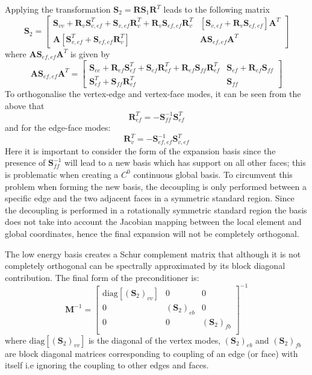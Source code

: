 %
Applying the transformation
$\mathbf{S}_{2}=\mathbf{R} \mathbf{S}_{1} \mathbf{R}^{T}$ leads to the following
matrix
%
\[
\mathbf{S}_{2}=\left[ \begin{array}{cc}
\mathbf{S}_{vv}+\mathbf{R}_{v}\mathbf{S}^{T}_{v,ef}+\mathbf{S}_{v,ef}\mathbf{R}^{T}_{v}+\mathbf{R}_{v}\mathbf{S}_{ef,ef}\mathbf{R}^{T}_{v} & [\mathbf{S}_{v,ef}+\mathbf{R}_{v}\mathbf{S}_{ef,ef}]\mathbf{A}^{T} \\
\mathbf{A}[\mathbf{S}^{T}_{v,ef}+\mathbf{S}_{ef,ef}\mathbf{R}^{T}_{v}] & \mathbf{A}\mathbf{S}_{ef,ef}\mathbf{A}^{T} \end{array} \right]
\]
%
where $\mathbf{A}\mathbf{S}_{ef,ef}\mathbf{A}^{T}$ is given by
%
\[
\mathbf{A}\mathbf{S}_{ef,ef}\mathbf{A}^{T}=\left[ \begin{array}{cc}
\mathbf{S}_{ee}+\mathbf{R}_{ef}\mathbf{S}^{T}_{ef}+\mathbf{S}_{ef}\mathbf{R}^{T}_{ef}+\mathbf{R}_{ef}\mathbf{S}_{ff}\mathbf{R}^{T}_{ef} & \mathbf{S}_{ef}+\mathbf{R}_{ef}\mathbf{S}_{ff}\\
\mathbf{S}^{T}_{ef}+\mathbf{S}_{ff}\mathbf{R}^{T}_{ef} & \mathbf{S}_{ff}
 \end{array} \right]
\]
%
To orthogonalise the vertex-edge and vertex-face modes, it can be seen from the
above that
%
\[
\mathbf{R}^{T}_{ef}=-\mathbf{S}^{-1}_{ff}\mathbf{S}^{T}_{ef}
\]
%
and for the edge-face modes:
%
\[
\mathbf{R}^{T}_{v}=-\mathbf{S}^{-1}_{ef,ef}\mathbf{S}^{T}_{v,ef}
\]
%
Here it is important to consider the form of the expansion basis since the
presence of $\mathbf{S}^{-1}_{ff}$ will lead to a new basis which has support on
all other faces; this is problematic when creating a $C^{0}$ continuous global
basis.  To circumvent this problem when forming the new basis, the decoupling is
only performed between a specific edge and the two adjacent faces in a symmetric
standard region. Since the decoupling is performed in a rotationally symmetric
standard region the basis does not take into account the Jacobian mapping
between the local element and global coordinates, hence the final expansion will
not be completely orthogonal.

The low energy basis creates a Schur complement matrix that although it is not
completely orthogonal can be spectrally approximated by its block diagonal
contribution. The final form of the preconditioner is:
%
\[
\mathbf{M}^{-1}=\left[ \begin{array}{ccc}
\mathrm{diag}[(\mathbf{S}_{2})_{vv}] & 0 & 0 \\
0 & (\mathbf{S}_{2})_{eb} & 0\\
0 & 0 & (\mathbf{S}_{2})_{fb}\\
 \end{array} \right]^{-1}
\]
%
where $\mathrm{diag}[(\mathbf{S}_{2})_{vv}]$ is the diagonal of the vertex
modes, $(\mathbf{S}_{2})_{eb}$ and $(\mathbf{S}_{2})_{fb}$ are block diagonal
matrices corresponding to coupling of an edge (or face) with itself i.e ignoring
the coupling to other edges and faces.
